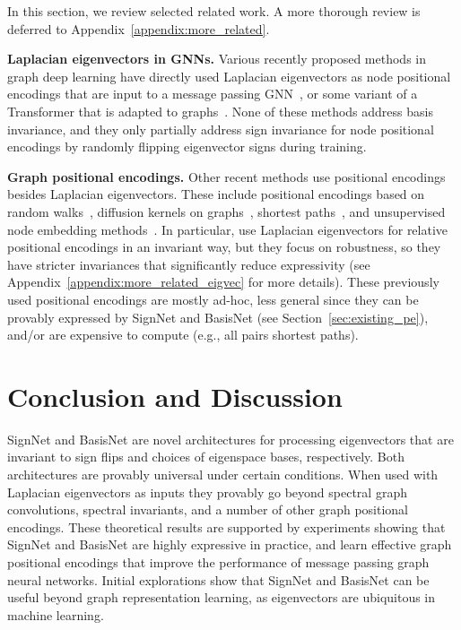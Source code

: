 \documentclass{article} \usepackage{iclr2023_conference,times}
\begin{document}
In this section, we review selected related work. A more thorough review is deferred to Appendix~\ref{appendix:more_related}.

\textbf{Laplacian eigenvectors in GNNs.} Various recently proposed methods in graph deep learning have directly used Laplacian eigenvectors as node positional encodings that are input to a message passing GNN~\citep{dwivedi2020benchmarking, dwivedi2022graph}, or some variant of a Transformer that is adapted to graphs~\citep{dwivedi2020generalization, kreuzer2021rethinking, mialon2021graphit, dwivedi2022graph, kim2022pure}. None of these methods address basis invariance, and they only partially address sign invariance for node positional encodings by randomly flipping eigenvector signs during training.


\textbf{Graph positional encodings.} Other recent methods use positional encodings besides Laplacian eigenvectors. These include positional encodings based on random walks~\citep{dwivedi2022graph,mialon2021graphit,li2020distance}, diffusion kernels on graphs~\citep{mialon2021graphit, feldman2022weisfeiler}, shortest paths~\citep{ying2021transformers,li2020distance}, and unsupervised node embedding methods~\citep{wang2022equivariant}. In particular, \cite{wang2022equivariant} use Laplacian eigenvectors for relative positional encodings in an invariant way, but they focus on robustness, so they have stricter invariances that significantly reduce expressivity (see Appendix~\ref{appendix:more_related_eigvec} for more details).
These previously used positional encodings are mostly ad-hoc, less general since they can be provably expressed by SignNet and BasisNet (see Section~\ref{sec:existing_pe}), and/or are expensive to compute (e.g., all pairs shortest paths). 



\section{Conclusion and Discussion}
SignNet and BasisNet are novel architectures for processing eigenvectors that are invariant to sign flips and choices of eigenspace bases, respectively. Both architectures are provably universal under certain conditions.
When used with Laplacian eigenvectors as inputs they provably go beyond spectral graph convolutions, spectral invariants, and a number of other graph positional encodings. These theoretical results are supported by experiments showing that SignNet and BasisNet are highly expressive in practice, and learn effective graph positional encodings that improve the performance of message passing graph neural networks. Initial explorations show that SignNet and BasisNet can be useful beyond graph representation learning, as eigenvectors are ubiquitous in machine learning.  
\end{document}
